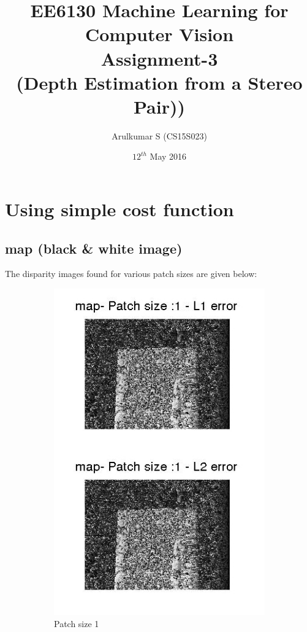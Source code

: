 \documentclass[fleqn]{article}
\title{EE6130 Machine Learning for Computer Vision\\ Assignment-3 \\(Depth Estimation from a Stereo Pair))}
\author{Arulkumar S (CS15S023) }
\date{$12^{th}$ May 2016}
\begin{document}
\tracingall
\maketitle


\section{Using simple cost function}
\subsection{map (black \& white image)}
The disparity images found for various patch sizes are given below:
\begin{figure}[!ht]
\begin{subfigure}{0.3\textwidth}
\centering
\includegraphics[scale=0.3]{./pics/map_disparity_patchsize_1.jpg}
\caption{Patch size 1}
\end{subfigure}%
 \begin{subfigure}{0.3\textwidth}
 \centering

\end{subfigure}
\end{figure}
\end{document}
